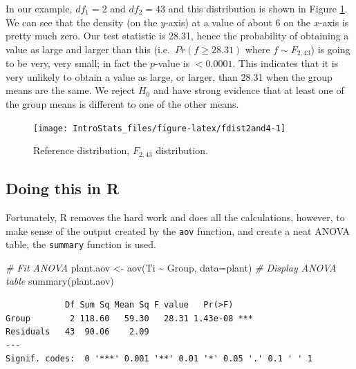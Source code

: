 \documentclass[
  oneside]{krantz}
\newenvironment{Shaded}{\begin{snugshade}}{\end{snugshade}}
\newcommand{\AttributeTok}[1]{\textcolor[rgb]{0.77,0.63,0.00}{#1}}
\newcommand{\CommentTok}[1]{\textcolor[rgb]{0.56,0.35,0.01}{\textit{#1}}}
\newcommand{\FunctionTok}[1]{\textcolor[rgb]{0.00,0.00,0.00}{#1}}
\newcommand{\NormalTok}[1]{#1}
\newcommand{\OtherTok}[1]{\textcolor[rgb]{0.56,0.35,0.01}{#1}}
\newcommand{\SpecialCharTok}[1]{\textcolor[rgb]{0.00,0.00,0.00}{#1}}
\begin{document}
In our example, \(df_1=2\) and \(df_2=43\) and this distribution is shown in Figure \ref{fig:fdist2and4}. We can see that the density (on the \(y\)-axis) at a value of about 6 on the \(x\)-axis is pretty much zero. Our test statistic is 28.31, hence the probability of obtaining a value as large and larger than this (i.e.~\(Pr(f \ge 28.31)\) where \(f \sim F_{2,43}\)) is going to be very, very small; in fact the \(p\)-value is \(<0.0001\). This indicates that it is very unlikely to obtain a value as large, or larger, than 28.31 when the group means are the same. We reject \(H_0\) and have strong evidence that at least one of the group means is different to one of the other means.

\begin{figure}

{\centering \texttt{[image: IntroStats\_files/figure-latex/fdist2and4-1]} 

}

\caption{Reference distribution, $F_{2,43}$ distribution.}\label{fig:fdist2and4}
\end{figure}

\hypertarget{doing-this-in-r-16}{%
\subsection{Doing this in R}\label{doing-this-in-r-16}}

Fortunately, R removes the hard work and does all the calculations, however, to make sense of the output created by the \texttt{aov} function, and create a neat ANOVA table, the \texttt{summary} function is used.

\begin{Shaded}
\begin{Highlighting}[]
\CommentTok{\# Fit ANOVA}
\NormalTok{plant.aov }\OtherTok{\textless{}{-}} \FunctionTok{aov}\NormalTok{(Ti }\SpecialCharTok{\textasciitilde{}}\NormalTok{ Group, }\AttributeTok{data=}\NormalTok{plant)}
\CommentTok{\# Display ANOVA table}
\FunctionTok{summary}\NormalTok{(plant.aov)}
\end{Highlighting}
\end{Shaded}

\begin{verbatim}
            Df Sum Sq Mean Sq F value   Pr(>F)    
Group        2 118.60   59.30   28.31 1.43e-08 ***
Residuals   43  90.06    2.09                     
---
Signif. codes:  0 '***' 0.001 '**' 0.01 '*' 0.05 '.' 0.1 ' ' 1
\end{verbatim}
\end{document}
